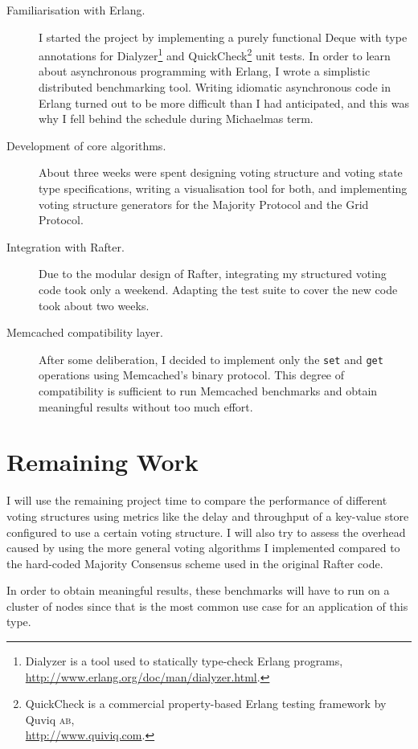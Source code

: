 \documentclass[11pt]{scrartcl}
\begin{document}
\begin{description}
    \item[Familiarisation with Erlang.] I started the project by implementing a purely functional Deque \cite{okasaki} with type annotations for Dialyzer\footnote{Dialyzer is a tool used to statically type-check Erlang programs,\\\url{http://www.erlang.org/doc/man/dialyzer.html}.} and QuickCheck\footnote{QuickCheck is a commercial property-based Erlang testing framework by Quviq \textsc{ab},\\\url{http://www.quiviq.com}.} unit tests. In order to learn about asynchronous programming with Erlang, I wrote a simplistic distributed benchmarking tool. Writing idiomatic asynchronous code in Erlang turned out to be more difficult than I had anticipated, and this was why I fell behind the schedule during Michaelmas term.
    \item[Development of core algorithms.] About three weeks were spent designing voting structure and voting state type specifications, writing a visualisation tool for both, and implementing voting structure generators for the Majority Protocol and the Grid Protocol.
    \item[Integration with Rafter.] Due to the modular design of Rafter, integrating my structured voting code took only a weekend. Adapting the test suite to cover the new code took about two weeks.
    \item[Memcached compatibility layer.] After some deliberation, I decided to implement only the \texttt{set} and \texttt{get} operations using Memcached's binary protocol. This degree of compatibility is sufficient to run Memcached benchmarks and obtain meaningful results without too much effort.
\end{description}

\section{Remaining Work%
  \label{remaining-work}%
}

I will use the remaining project time to compare the performance of different voting structures using metrics like the delay and throughput of a key-value store configured to use a certain voting structure. I will also try to assess the overhead caused by using the more general voting algorithms I implemented compared to the hard-coded Majority Consensus scheme used in the original Rafter code.

In order to obtain meaningful results, these benchmarks will have to run on a cluster of nodes since that is the most common use case for an application of this type.
\end{document}
